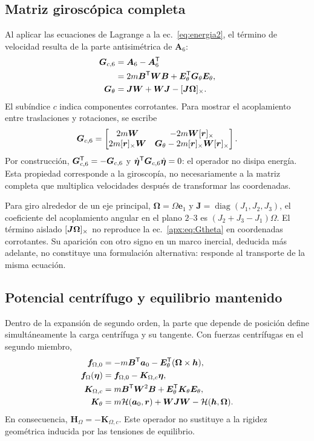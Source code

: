 \subsection{Matriz giroscópica completa}
Al aplicar las ecuaciones de Lagrange a la ec.~\eqref{eq:energia2}, el término de velocidad resulta de la parte antisimétrica de $\bm A_6$:
\begin{align}
\bm G_{c,6}&=\bm A_6-\bm A_6^\mathsf T\nonumber\\
&=2m\bm B^\mathsf T\bm W\bm B+\bm E_\theta^\mathsf T\bm G_\theta\bm E_\theta,\label{apx:eq:G6}\\
\bm G_\theta&=\bm J\bm W+\bm W\bm J-[\bm{J\Omega}]_\times.
\label{apx:eq:Gtheta}
\end{align}
El subíndice $c$ indica componentes corrotantes. Para mostrar el acoplamiento entre traslaciones y rotaciones, se escribe
\begin{equation}
\bm G_{c,6}=\begin{bmatrix}
2m\bm W&-2m\bm W[\bm{r}]_\times\\
2m[\bm{r}]_\times\bm W&\bm G_\theta-2m[\bm{r}]_\times\bm W[\bm{r}]_\times
\end{bmatrix}.
\label{apx:eq:Gblocks}
\end{equation}
Por construcción, $\bm G_{c,6}^\mathsf T=-\bm G_{c,6}$ y $\dot{\bm\eta}^\mathsf T\bm G_{c,6}\dot{\bm\eta}=0$: el operador no disipa energía. Esta propiedad corresponde a la giroscopía, no necesariamente a la matriz completa que multiplica velocidades después de transformar las coordenadas.

Para giro alrededor de un eje principal, $\bm\Omega=\Omega\bm e_1$ y $\bm J=\operatorname{diag}(J_1,J_2,J_3)$, el coeficiente del acoplamiento angular en el plano $2$--$3$ es $(J_2+J_3-J_1)\Omega$. El término aislado $[\bm{J\Omega}]_\times$ no reproduce la ec.~\eqref{apx:eq:Gtheta} en coordenadas corrotantes. Su aparición con otro signo en un marco inercial, deducida más adelante, no constituye una formulación alternativa: responde al transporte de la misma ecuación.

\subsection{Potencial centrífugo y equilibrio mantenido}
Dentro de la expansión de segundo orden, la parte que depende de posición define simultáneamente la carga centrífuga y su tangente. Con fuerzas centrífugas en el segundo miembro,
\begin{align}
\bm f_{\Omega,0}&=-m\bm B^\mathsf T\bm a_0-\bm E_\theta^\mathsf T(\bm\Omega\times\bm h),\nonumber\\
\bm f_\Omega(\bm\eta)&=\bm f_{\Omega,0}-\bm K_{\Omega,c}\bm\eta,\label{apx:eq:fOmega}\\
\bm K_{\Omega,c}&=m\bm B^\mathsf T\bm W^2\bm B+\bm E_\theta^\mathsf T\bm K_\theta\bm E_\theta,\nonumber\\
\bm K_\theta&=m\mathcal H(\bm a_0,\bm r)+\bm W\bm J\bm W
-\mathcal H(\bm h,\bm\Omega).
\label{apx:eq:KOmega}
\end{align}
En consecuencia, $\bm H_\Omega=-\bm K_{\Omega,c}$. Este operador no sustituye a la rigidez geométrica inducida por las tensiones de equilibrio.

